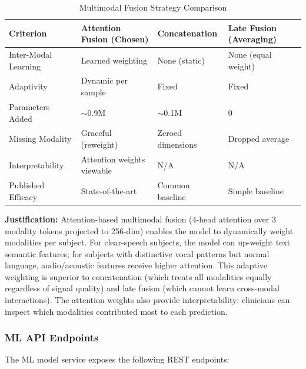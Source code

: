 \documentclass[12pt]{article}
\begin{document}
	\begin{table}[H]
		\centering
		\caption{Multimodal Fusion Strategy Comparison}
		\small
		\begin{tabular}{|p{2.2cm}|p{2.5cm}|p{2.5cm}|p{2.5cm}|}
			\hline
			\textbf{Criterion} & \textbf{Attention Fusion (Chosen)} & \textbf{Concatenation} & \textbf{Late Fusion (Averaging)} \\ \hline
			Inter-Modal Learning & Learned weighting & None (static) & None (equal weight) \\ \hline
			Adaptivity & Dynamic per sample & Fixed & Fixed \\ \hline
			Parameters Added & $\sim$0.9M & $\sim$0.1M & 0 \\ \hline
			Missing Modality & Graceful (reweight) & Zeroed dimensions & Dropped average \\ \hline
			Interpretability & Attention weights viewable & N/A & N/A \\ \hline
			Published Efficacy & State-of-the-art & Common baseline & Simple baseline \\ \hline
		\end{tabular}
	\end{table}

	\textbf{Justification:} Attention-based multimodal fusion (4-head attention over 3 modality tokens projected to 256-dim) enables the model to dynamically weight modalities per subject. For clear-speech subjects, the model can up-weight text semantic features; for subjects with distinctive vocal patterns but normal language, audio/acoustic features receive higher attention. This adaptive weighting is superior to concatenation (which treats all modalities equally regardless of signal quality) and late fusion (which cannot learn cross-modal interactions). The attention weights also provide interpretability: clinicians can inspect which modalities contributed most to each prediction.

	\subsubsection{ML API Endpoints}

	The ML model service exposes the following REST endpoints:
\end{document}
